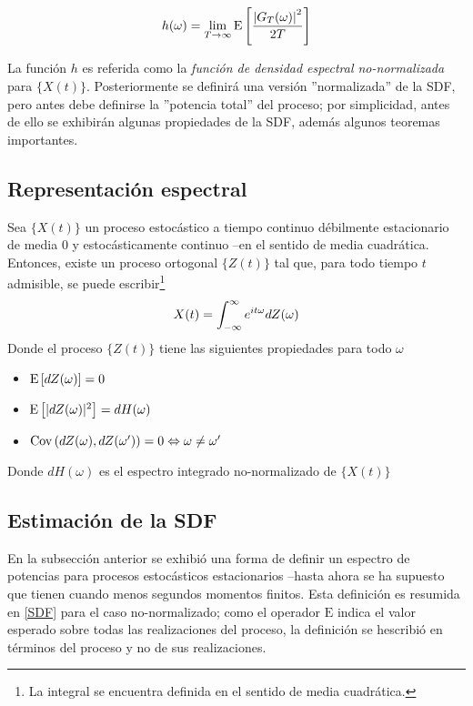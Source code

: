 \begin{equation}
h(\omega) = \lim_{T\rightarrow \infty} \mathrm{E}\left[  \frac{ \left| G_T(\omega) \right|^{2}}{2 T}  \right]
\end{equation}

La funci\'on $h$ es referida como la \textit{funci\'on de densidad espectral no-normalizada} para
$\{X(t)\}$. Posteriormente se definir\'a una versi\'on ''normalizada'' de la SDF, pero antes debe
definirse la ''potencia total'' del proceso; por simplicidad, antes de ello se exhibir\'an
algunas propiedades de la SDF, adem\'as algunos teoremas importantes.


\subsection{Representaci\'on espectral}

\begin{thrm}
Sea $\{X(t)\}$ un proceso estoc\'astico a tiempo continuo d\'ebilmente estacionario
de media 0
y estoc\'asticamente continuo --en el 
sentido de media cuadr\'atica. Entonces, existe un proceso ortogonal $\{Z(t)\}$ tal que, para 
todo tiempo $t$ admisible, se puede escribir\footnote{La integral se encuentra definida en el
sentido de media cuadr\'atica.}
\begin{equation*}
X(t) = \int_{-\infty}^{\infty} e^{i t \omega} dZ(\omega)
\end{equation*}
Donde el proceso $\{Z(t)\}$ tiene las siguientes propiedades para todo $\omega$
\begin{itemize}
\item $\mathrm{E}\left[ dZ(\omega) \right] = 0$
\item $\mathrm{E}\left[ \lvert dZ(\omega) \rvert^{2} \right] = dH(\omega)$
\item $\mathrm{Cov}\left( dZ(\omega),dZ(\omega^{\prime}) \right) = 0 \Leftrightarrow \omega \neq \omega^{\prime}$
\end{itemize}
Donde $dH(\omega)$ es el espectro integrado no-normalizado de $\{X(t)\}$
\end{thrm}


\subsection{Estimaci\'on de la SDF}

En la subsecci\'on anterior se exhibi\'o una forma de definir un espectro de potencias para 
procesos estoc\'asticos estacionarios --hasta ahora se ha supuesto que tienen cuando menos
segundos momentos finitos. Esta definici\'on es resumida en \ref{SDF} para el caso no-normalizado;
como el operador $\mathrm{E}$ indica el valor esperado sobre todas las realizaciones del proceso,
la definici\'on se hescribi\'o en t\'erminos del proceso y no de sus realizaciones.

